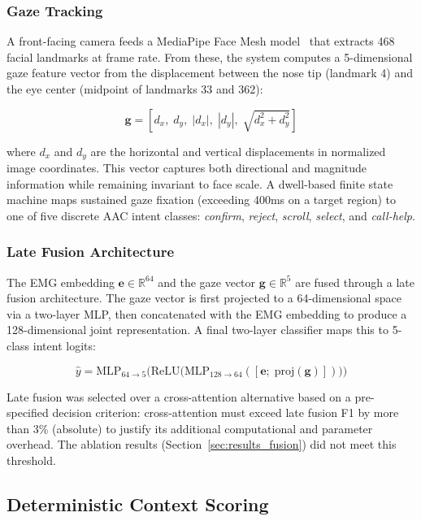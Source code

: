 \subsubsection{Gaze Tracking}
A front-facing camera feeds a MediaPipe Face Mesh model~\cite{mediapipe} that extracts 468 facial landmarks at frame rate. From these, the system computes a 5-dimensional gaze feature vector from the displacement between the nose tip (landmark 4) and the eye center (midpoint of landmarks 33 and 362):

\begin{equation}
\mathbf{g} = [d_x,\; d_y,\; |d_x|,\; |d_y|,\; \sqrt{d_x^2 + d_y^2}]
\label{eq:gaze_vector}
\end{equation}

\noindent where $d_x$ and $d_y$ are the horizontal and vertical displacements in normalized image coordinates. This vector captures both directional and magnitude information while remaining invariant to face scale. A dwell-based finite state machine maps sustained gaze fixation (exceeding 400ms on a target region) to one of five discrete AAC intent classes: \emph{confirm}, \emph{reject}, \emph{scroll}, \emph{select}, and \emph{call-help}.

\subsubsection{Late Fusion Architecture}
The EMG embedding $\mathbf{e} \in \mathbb{R}^{64}$ and the gaze vector $\mathbf{g} \in \mathbb{R}^{5}$ are fused through a late fusion architecture. The gaze vector is first projected to a 64-dimensional space via a two-layer MLP, then concatenated with the EMG embedding to produce a 128-dimensional joint representation. A final two-layer classifier maps this to 5-class intent logits:

\begin{equation}
\hat{y} = \text{MLP}_{64 \rightarrow 5}\big(\text{ReLU}\big(\text{MLP}_{128 \rightarrow 64}([\mathbf{e};\; \text{proj}(\mathbf{g})])\big)\big)
\label{eq:late_fusion}
\end{equation}

Late fusion was selected over a cross-attention alternative based on a pre-specified decision criterion: cross-attention must exceed late fusion F1 by more than 3\% (absolute) to justify its additional computational and parameter overhead. The ablation results (Section~\ref{sec:results_fusion}) did not meet this threshold.

\subsection{Deterministic Context Scoring}
\label{sec:scoring}

